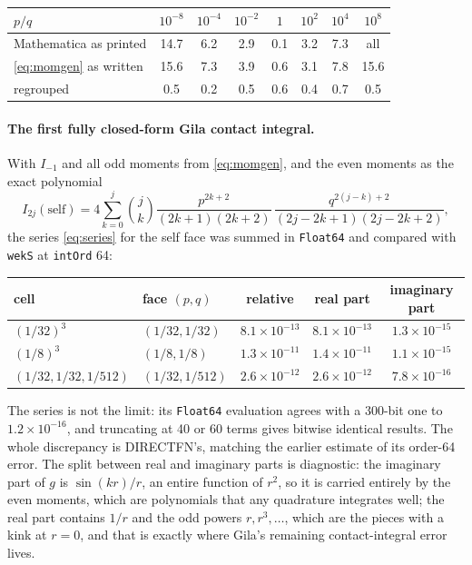 \documentclass[11pt]{article}
\theoremstyle{remark}
\newcommand{\code}[1]{\texttt{#1}}
\begin{document}
\begin{center}
\small
\begin{tabular}{@{}lccccccc@{}}
\toprule
$p/q$ & $10^{-8}$ & $10^{-4}$ & $10^{-2}$ & $1$ & $10^{2}$ & $10^{4}$ & $10^{8}$ \\
\midrule
Mathematica as printed & 14.7 & 6.2 & 2.9 & 0.1 & 3.2 & 7.3 & all \\
\eqref{eq:momgen} as written & 15.6 & 7.3 & 3.9 & 0.6 & 3.1 & 7.8 & 15.6 \\
regrouped & 0.5 & 0.2 & 0.5 & 0.6 & 0.4 & 0.7 & 0.5 \\
\bottomrule
\end{tabular}
\end{center}

\paragraph{The first fully closed-form Gila contact integral.} With $I_{-1}$ and all
odd moments from \eqref{eq:momgen}, and the even moments as the exact polynomial
\begin{equation}
I_{2j}(\text{self}) = 4\sum_{k=0}^{j}\binom{j}{k}\frac{p^{2k+2}}{(2k+1)(2k+2)}\,\frac{q^{2(j-k)+2}}{(2j-2k+1)(2j-2k+2)},
\end{equation}
the series \eqref{eq:series} for the self face was summed in \code{Float64} and compared
with \code{wekS} at \code{intOrd} 64:

\begin{center}
\small
\begin{tabular}{@{}llccc@{}}
\toprule
cell & face $(p,q)$ & relative & real part & imaginary part \\
\midrule
$(1/32)^3$ & $(1/32, 1/32)$ & $8.1\times10^{-13}$ & $8.1\times10^{-13}$ & $1.3\times10^{-15}$ \\
$(1/8)^3$ & $(1/8, 1/8)$ & $1.3\times10^{-11}$ & $1.4\times10^{-11}$ & $1.1\times10^{-15}$ \\
$(1/32,1/32,1/512)$ & $(1/32, 1/512)$ & $2.6\times10^{-12}$ & $2.6\times10^{-12}$ & $7.8\times10^{-16}$ \\
\bottomrule
\end{tabular}
\end{center}
The series is not the limit: its \code{Float64} evaluation agrees with a 300-bit one
to $1.2\times10^{-16}$, and truncating at 40 or 60 terms gives bitwise identical
results. The whole discrepancy is DIRECTFN's, matching the earlier estimate of its
order-64 error. The split between real and imaginary parts is diagnostic: the imaginary
part of $g$ is $\sin(kr)/r$, an entire function of $r^2$, so it is carried entirely by
the even moments, which are polynomials that any quadrature integrates well; the real
part contains $1/r$ and the odd powers $r, r^3, \ldots$, which are the pieces with a
kink at $r = 0$, and that is exactly where Gila's remaining contact-integral error
lives.
\end{document}
